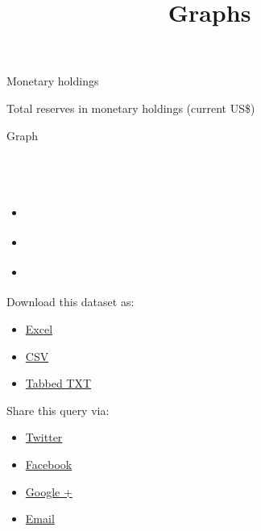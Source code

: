 \documentclass[
]{article}
\title{Graphs}
\author{}
\date{}
\providecommand{\tightlist}{%
  \setlength{\itemsep}{0pt}\setlength{\parskip}{0pt}}
\begin{document}
\maketitle

Monetary holdings

\hypertarget{widgetTitle}{}
Total reserves in monetary holdings (current US\$)

\hypertarget{widgetDesc}{}
Graph

\hypertarget{widgetpreview}{}
\hypertarget{widgetpreviewcontent}{}
\hypertarget{divtoolbar}{}
\hypertarget{section}{%
\subsection{\texorpdfstring{\protect\hypertarget{lblTitle}{}{~}}{~}}\label{section}}

\begin{itemize}
\tightlist
\item
  \protect\hypertarget{aAboutReport}{\href{../../../views/reports/\#widget-description-panel}{{}}}
\item
  \protect\hypertarget{aDownloadData}{\href{../../../views/reports/\#widget-download-panel}{{}}}
\item
  \protect\hypertarget{aShareQuery}{\href{../../../views/reports/\#widget-share-panel}{{}}}
\end{itemize}

\hypertarget{widget-description-panel}{}

\hypertarget{widget-download-panel}{}
Download this dataset as:

\begin{itemize}
\tightlist
\item
  \protect\hyperlink{}{{}\protect\hypertarget{sExcel}{}{Excel}}
\item
  \protect\hyperlink{}{{}\protect\hypertarget{sCSV}{}{CSV}}
\item
  \protect\hyperlink{}{{}\protect\hypertarget{sTabbedTXT}{}{Tabbed TXT}}
\end{itemize}

\hypertarget{widget-share-panel}{}
Share this query via:

\begin{itemize}
\tightlist
\item
  \href{Javascript:Widgettwitter();}{{}\protect\hypertarget{sTwitter}{}{Twitter}}
\item
  \href{Javascript:Widgetfacebook();}{{}\protect\hypertarget{sFaceBook}{}{Facebook}}
\item
  \href{Javascript:WidgetGooglePlus();}{{}\protect\hypertarget{sGooglePlus}{}{Google
  +}}
\item
  \href{Javascript:WidgetEmail();}{{}\protect\hypertarget{sEmail}{}{Email}}
\end{itemize}
\end{document}
